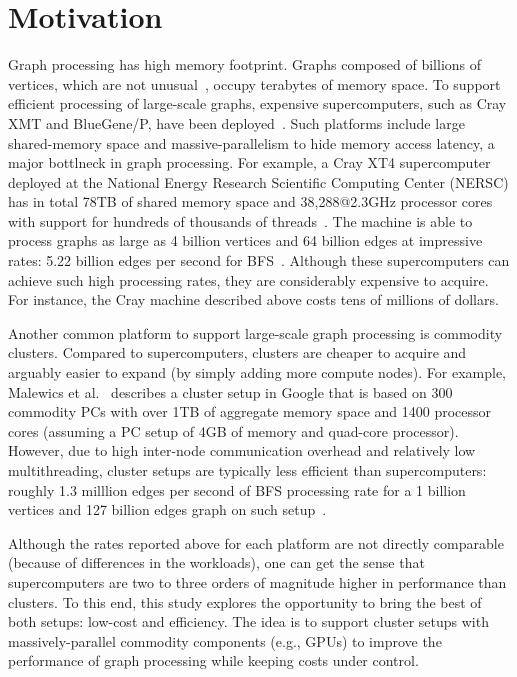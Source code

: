 \section{Motivation}
\label{sec:motivation}

Graph processing has high memory footprint. Graphs composed of billions of vertices, which are not unusual~\cite{graph500}, occupy terabytes of memory space. To support efficient processing of large-scale graphs, expensive supercomputers, such as Cray XMT and BlueGene/P, have been deployed~\cite{mizell2009early, yoo2005scalable}. Such platforms include large shared-memory space and massive-parallelism to hide memory access latency, a major bottlneck in graph processing. For example, a Cray XT4 supercomputer deployed at the National Energy Research Scientific Computing Center (NERSC) has in total 78TB of shared memory space and 38,288@2.3GHz processor cores with support for hundreds of thousands of threads~\cite{franklin2011cray}. The machine is able to process graphs as large as 4 billion vertices and 64 billion edges at impressive rates: 5.22 billion edges per second for BFS~\cite{graph500}. Although these supercomputers can achieve such high processing rates, they are considerably expensive to acquire. For instance, the Cray machine described above costs tens of millions of dollars.

Another common platform to support large-scale graph processing is commodity clusters. Compared to supercomputers, clusters are cheaper to acquire and arguably easier to expand (by simply adding more compute nodes). For example, Malewics et al.~\cite{Malewicz2009} describes a cluster setup in Google that is based on 300 commodity PCs with over 1TB of aggregate memory space and 1400 processor cores (assuming a PC setup of 4GB of memory and quad-core processor). However, due to high inter-node communication overhead and relatively low multithreading, cluster setups are typically less efficient than supercomputers: roughly 1.3 milllion edges per second of BFS processing rate for a 1 billion vertices and 127 billion edges graph on such setup~\cite{Malewicz2009}.

Although the rates reported above for each platform are not directly comparable (because of differences in the workloads), one can get the sense that supercomputers are two to three orders of magnitude higher in performance than clusters. To this end, this study explores the opportunity to bring the best of both setups: low-cost and efficiency. The idea is to support cluster setups with massively-parallel commodity components (e.g., GPUs) to improve the performance of graph processing while keeping costs under control.
